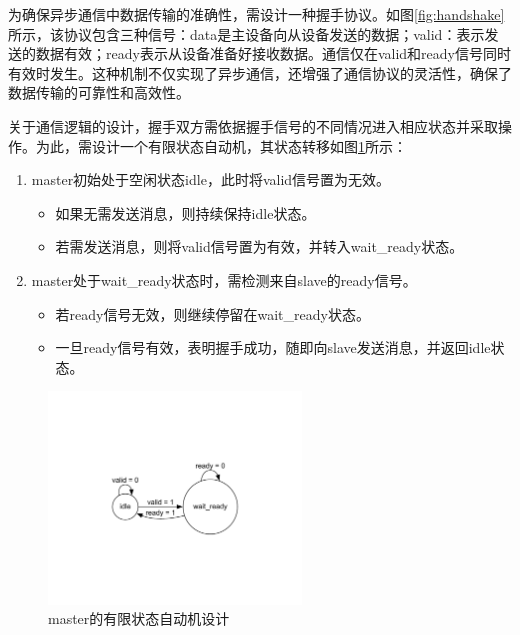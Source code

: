 为确保异步通信中数据传输的准确性，需设计一种握手协议。如图\ref{fig:handshake}所示，该协议包含三种信号：data是主设备向从设备发送的数据；valid：表示发送的数据有效；ready表示从设备准备好接收数据。通信仅在valid和ready信号同时有效时发生。这种机制不仅实现了异步通信，还增强了通信协议的灵活性，确保了数据传输的可靠性和高效性。

关于通信逻辑的设计，握手双方需依据握手信号的不同情况进入相应状态并采取操作。为此，需设计一个有限状态自动机，其状态转移如图\ref{fig:handshake_automata}所示：

\begin{enumerate}[label={\arabic*)}, itemsep=0pt, parsep=0pt]
	\item master初始处于空闲状态idle，此时将valid信号置为无效。
	      \begin{itemize}
		      \item 如果无需发送消息，则持续保持idle状态。
		      \item 若需发送消息，则将valid信号置为有效，并转入wait\_ready状态。
	      \end{itemize}
	\item master处于wait\_ready状态时，需检测来自slave的ready信号。
	      \begin{itemize}
		      \item 若ready信号无效，则继续停留在wait\_ready状态。
		      \item 一旦ready信号有效，表明握手成功，随即向slave发送消息，并返回idle状态。
	      \end{itemize}
\end{enumerate}

\begin{figure}[htbp]
	\centering
	\includegraphics[width=0.6\textwidth]{image/handshake_automata.pdf}
	\caption{master的有限状态自动机设计}
	\label{fig:handshake_automata}
\end{figure}

